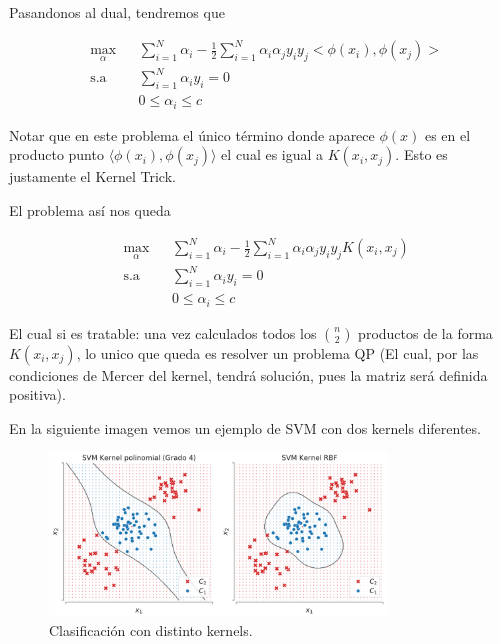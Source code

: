 Pasandonos al dual, tendremos que

\begin{equation*}
\begin{aligned}
& \underset{\alpha}{\text{max}}
& & \sum\limits_{i=1}^{N}\alpha_i - \frac{1}{2} \sum\limits_{i=1}^{N} \alpha_i \alpha_j y_i y_j <\phi(x_i), \phi(x_j)>\\
& \text{s.a}
& & \sum\limits_{i=1}^{N} \alpha_i y_i= 0 \\
& &  &0 \leq \alpha_i \leq c
\end{aligned}
\end{equation*}

Notar que en este problema el único término donde aparece $\phi(x)$ es en el producto punto $\langle \phi(x_i), \phi(x_j)\rangle$ el cual es igual a $K(x_i,x_j)$. Esto es justamente el Kernel Trick.

El problema así nos queda

\begin{equation*}
\begin{aligned}
& \underset{\alpha}{\text{max}}
& & \sum\limits_{i=1}^{N}\alpha_i - \frac{1}{2} \sum\limits_{i=1}^{N} \alpha_i \alpha_j y_i y_j K(x_i, x_j)\\
& \text{s.a}
& & \sum\limits_{i=1}^{N} \alpha_i y_i= 0 \\
& &  &0 \leq \alpha_i \leq c
\end{aligned}
\end{equation*}

El cual si es tratable: una vez calculados todos los $\binom{n}{2}$ productos de la forma $K(x_i, x_j)$, lo unico que queda es resolver un problema QP (El cual, por las condiciones de Mercer del kernel, tendrá solución, pues la matriz será definida positiva). 

En la siguiente imagen vemos un ejemplo de SVM con dos kernels diferentes.

\begin{figure}[ht]
    \centering
    \includegraphics[width=0.8\textwidth]{img/cap5_svm_2kernels}
    \caption{Clasificación con distinto kernels.}
    \label{im:ca5_im6}
\end{figure}

